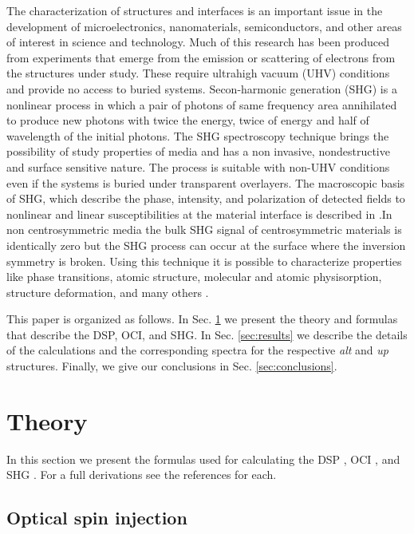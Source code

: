\documentclass[pss]{wiley2sp} %
\begin{document}
The characterization of structures and interfaces is an important issue in the development of microelectronics, nanomaterials, semiconductors, and other areas of interest in science and technology. Much of this research has been produced from experiments that emerge from the emission or scattering of electrons from the structures under study. These require ultrahigh vacuum (UHV) conditions and provide no access to buried systems. Secon-harmonic generation (SHG) is a nonlinear process in which a pair of photons of same frequency area annihilated to produce new photons with twice the energy, twice of energy and half of wavelength of the initial photons. The SHG spectroscopy technique brings the possibility of study properties of media and has a non invasive, nondestructive and surface sensitive nature. The process is suitable with non-UHV conditions even if the systems is buried under transparent overlayers. The macroscopic basis of SHG, which describe the phase, intensity, and polarization of detected fields to nonlinear and linear susceptibilities at the material interface is described in \cite{downerSIA01}.In non centrosymmetric media the bulk SHG signal of centrosymmetric materials is identically zero but the SHG process can occur at the surface where the inversion symmetry is broken. Using this technique it is possible to characterize properties like phase transitions, atomic structure, molecular and atomic physisorption, structure deformation, and many others \cite{dadapPRB97,godefroyAPL96,salazarPRB14,mendozaPRL98}. 

This paper is organized as follows. In Sec. \ref{sec:theory} we present the theory and formulas that describe the DSP, OCI, and SHG. In Sec. \ref{sec:results} we describe the details of the calculations and the corresponding spectra for the respective \emph{alt} and \emph{up} structures. Finally, we give our conclusions in Sec. \ref{sec:conclusions}.


\section{Theory}\label{sec:theory}

In this section we present the formulas used for calculating the DSP \cite{nastosPRB07,mendozaPRB12}, OCI \cite{cabellosPRB11,sipePRB00}, and SHG \cite{andersonPRB15}. For a full derivations see the references for each.


\subsection{Optical spin injection}\label{sec:theory-DSP}
\end{document}
